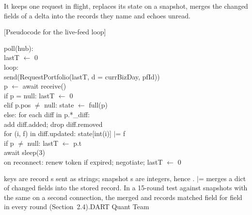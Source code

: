 \documentclass[9pt]{article}
\newcommand{\code}[1]{{\ttfamily\detokenize{#1}}}
\begin{document}
 It keeps one request in flight, replaces its state on a snapshot, merges the changed fields of a delta into the records they name and echoes \code{t} unread.

[Pseudocode for the live-feed loop]{%
\begin{minipage}{0.94\linewidth}\fontsize{8.3}{10.8}\selectfont\ttfamily
poll(hub):\\
\hspace*{4mm}lastT $\leftarrow$ 0\\
\hspace*{4mm}loop:\\
\hspace*{8mm}send(RequestPortfolio(lastT, d = currBizDay, pfId))\\
\hspace*{8mm}p $\leftarrow$ await receive()\\
\hspace*{8mm}if p = null: lastT $\leftarrow$ 0\\
\hspace*{8mm}elif p.pos $\neq$ null: state $\leftarrow$ full(p)\\
\hspace*{8mm}else: for each diff in p.*\_diff:\\
\hspace*{12mm}add diff.added; drop diff.removed\\
\hspace*{12mm}for (i, f) in diff.updated: state[int(i)] $\mid$= f\\
\hspace*{8mm}if p $\neq$ null: lastT $\leftarrow$ p.t\\
\hspace*{8mm}await sleep(3)\\
\hspace*{4mm}on reconnect: renew token if expired; negotiate; lastT $\leftarrow$ 0
\end{minipage}}{\code{updated} keys are record \code{Id}s sent as strings; snapshot \code{Id}s are integers, hence \code{int(i)}. $\mid$= merges a dict of changed fields into the stored record. In a 15-round test against snapshots with the same \code{t} on a second connection, the merged \code{pos} and \code{ords} records matched field for field in every round (Section~2.4).}{DART Quant Team}
\end{document}
